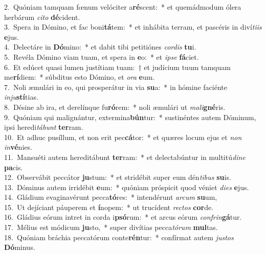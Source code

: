 {2.~}Quóniam tamquam fœnum velóciter a\textbf{ré}scent:~* et quemádmodum ólera herbárum \textit{ci}\textit{to} \textbf{dé}cident.\\
{3.~}Spera in Dómino, et fac boni\textbf{tá}tem:~* et inhábita terram, et pascéris in diví\textit{ti}\textit{is} \textbf{e}jus.\\
{4.~}Delectáre in \textbf{Dó}mino:~* et dabit tibi petitiónes \textit{cor}\textit{dis} \textbf{tu}i.\\
{5.~}Revéla Dómino viam tuam, et spera in \textbf{e}o:~* et \textit{i}\textit{pse} \textbf{fá}ciet.\\
{6.~}Et edúcet quasi lumen justítiam tuam:~† et judícium tuum tamquam me\textbf{rí}diem:~* súbditus esto Dómino, et \textit{o}\textit{ra} \textbf{e}um.\\
{7.~}Noli æmulári in eo, qui prosperátur in via \textbf{su}a:~* in hómine faciénte \textit{in}\textit{ju}\textbf{stí}tias.\\
{8.~}Désine ab ira, et derelínque fu\textbf{ró}rem:~* noli æmulári ut \textit{ma}\textit{li}\textbf{gné}ris.\\
{9.~}Quóniam qui malignántur, extermina\textbf{bún}tur:~* sustinéntes autem Dóminum, ipsi heredi\textit{tá}\textit{bunt} \textbf{ter}ram.\\
{10.~}Et adhuc pusíllum, et non erit pec\textbf{cá}tor:~* et quæres locum ejus et \textit{non} \textit{in}\textbf{vé}nies.\\
{11.~}Mansuéti autem hereditábunt \textbf{ter}ram:~* et delectabúntur in multitú\textit{di}\textit{ne} \textbf{pa}cis.\\
{12.~}Observábit peccátor \textbf{ju}stum:~* et stridébit super eum dén\textit{ti}\textit{bus} \textbf{su}is.\\
{13.~}Dóminus autem irridébit \textbf{e}um:~* quóniam próspicit quod véniet \textit{di}\textit{es} \textbf{e}jus.\\
{14.~}Gládium evaginavérunt pecca\textbf{tó}res:~* intendérunt \textit{ar}\textit{cum} \textbf{su}um,\\
{15.~}Ut dejíciant páuperem et \textbf{í}nopem:~* ut trucídent \textit{re}\textit{ctos} \textbf{cor}de.\\
{16.~}Gládius eórum intret in corda i\textbf{psó}rum:~* et arcus eórum \textit{con}\textit{frin}\textbf{gá}tur.\\
{17.~}Mélius est módicum \textbf{ju}sto,~* super divítias pecca\textit{tó}\textit{rum} \textbf{mul}tas.\\
{18.~}Quóniam bráchia peccatórum conte\textbf{rén}tur:~* confírmat autem \textit{ju}\textit{stos} \textbf{Dó}minus.\\
